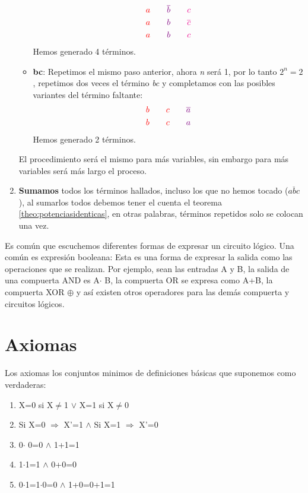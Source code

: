\documentclass[11pt,fleqn]{book} %
\begin{document}
\begin{enumerate}
\begin{itemize}
\begin{align*}
&\textcolor{red}{a}\hspace{20pt}\textcolor{violet}{\overline{b}}\hspace{20pt}\textcolor{magenta}{c}\\
&\textcolor{red}{a}\hspace{20pt}\textcolor{violet}{b}\hspace{20pt}\textcolor{magenta}{\overline{c}}\\
&\textcolor{red}{a}\hspace{20pt}\textcolor{violet}{b}\hspace{20pt}\textcolor{magenta}{c}\\
\end{align*}
Hemos generado 4 términos.
\item \textbf{bc}: Repetimos el mismo paso anterior, ahora \textit{n} será 1, por lo tanto $2^n=2$, repetimos dos veces el término \textit{bc} y completamos con las posibles variantes del término faltante:
\begin{align*}
&\textcolor{red}{b\hspace{20pt}c}\hspace{20pt}\textcolor{violet}{\overline{a}}\\
&\textcolor{red}{b\hspace{20pt}c}\hspace{20pt}\textcolor{violet}{a}\\
\end{align*}
Hemos generado 2 términos.
\end{itemize}
El procedimiento será el mismo para más variables, sin embargo para más variables será más largo el proceso. 
\item \textbf{Sumamos} todos los términos hallados, incluso los que no hemos tocado ($\overline{abc}$), al sumarlos todos debemos tener el cuenta el teorema \ref{theo:potenciasidenticas}, en otras palabras, términos repetidos solo se colocan una vez.
\end{enumerate}
\begin{remark}
Es común que escuchemos diferentes formas de expresar un circuito lógico. Una común es expresión booleana: Esta es una forma de expresar la salida como las operaciones que se realizan. Por ejemplo, sean las entradas A y B, la salida de una compuerta AND es A$\cdot$ B, la compuerta OR se expresa como A+B, la compuerta XOR $\oplus$ y así existen otros operadores para las demás compuerta y circuitos lógicos.
\end{remark}
\section{Axiomas}
Los axiomas los conjuntos minimos de definiciones básicas que suponemos como verdaderas:
\begin{enumerate}
\item X=0 si X$\neq$1 $\lor$ X=1 si X$\neq$0
\item Si X=0 $\Rightarrow$ X'=1 $\land$ Si X=1 $\Rightarrow$ X'=0
\item 0$\cdot$ 0=0 $\land$ 1+1=1
\item 1$\cdot$1=1 $\land$ 0+0=0
\item 0$\cdot$1=1$\cdot$0=0 $\land$ 1+0=0+1=1
\end{enumerate}
\end{document}
